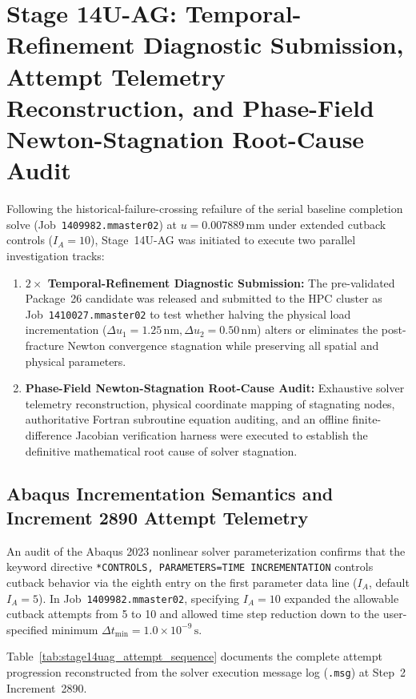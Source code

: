 \section{Stage 14U-AG: Temporal-Refinement Diagnostic Submission, Attempt Telemetry Reconstruction, and Phase-Field Newton-Stagnation Root-Cause Audit}
\label{sec:stage14uag_temporal_diagnostic_and_stagnation_audit}

Following the historical-failure-crossing refailure of the serial baseline completion solve (Job~\texttt{1409982.mmaster02}) at $u = 0.007889\,\mathrm{mm}$ under extended cutback controls ($I_A=10$), Stage~14U-AG was initiated to execute two parallel investigation tracks:
\begin{enumerate}
  \item \textbf{$2\times$ Temporal-Refinement Diagnostic Submission:} The pre-validated Package~26 candidate was released and submitted to the HPC cluster as Job~\texttt{1410027.mmaster02} to test whether halving the physical load incrementation ($\Delta u_1 = 1.25\,\mathrm{nm}, \Delta u_2 = 0.50\,\mathrm{nm}$) alters or eliminates the post-fracture Newton convergence stagnation while preserving all spatial and physical parameters.
  \item \textbf{Phase-Field Newton-Stagnation Root-Cause Audit:} Exhaustive solver telemetry reconstruction, physical coordinate mapping of stagnating nodes, authoritative Fortran subroutine equation auditing, and an offline finite-difference Jacobian verification harness were executed to establish the definitive mathematical root cause of solver stagnation.
\end{enumerate}

\subsection{Abaqus Incrementation Semantics and Increment 2890 Attempt Telemetry}
\label{subsec:stage14uag_attempt_telemetry}

An audit of the Abaqus 2023 nonlinear solver parameterization confirms that the keyword directive \texttt{*CONTROLS, PARAMETERS=TIME INCREMENTATION} controls cutback behavior via the eighth entry on the first parameter data line ($I_A$, default $I_A=5$). In Job~\texttt{1409982.mmaster02}, specifying $I_A=10$ expanded the allowable cutback attempts from 5 to 10 and allowed time step reduction down to the user-specified minimum $\Delta t_{\min} = 1.0\times 10^{-9}\,\mathrm{s}$.

Table~\ref{tab:stage14uag_attempt_sequence} documents the complete attempt progression reconstructed from the solver execution message log (\texttt{.msg}) at Step~2 Increment~2890.

